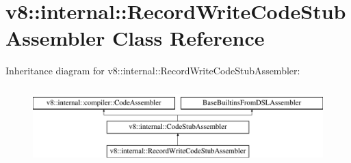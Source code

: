 \hypertarget{classv8_1_1internal_1_1RecordWriteCodeStubAssembler}{}\section{v8\+:\+:internal\+:\+:Record\+Write\+Code\+Stub\+Assembler Class Reference}
\label{classv8_1_1internal_1_1RecordWriteCodeStubAssembler}
Inheritance diagram for v8\+:\+:internal\+:\+:Record\+Write\+Code\+Stub\+Assembler\+:\begin{figure}[H]
\begin{center}
\leavevmode
\includegraphics[height=3.000000cm]{classv8_1_1internal_1_1RecordWriteCodeStubAssembler}
\end{center}
\end{figure}

